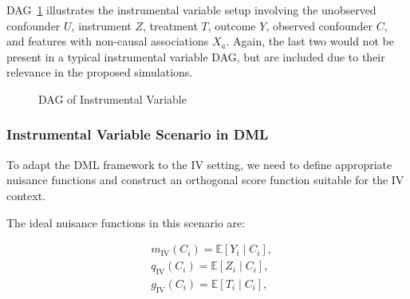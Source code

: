 \documentclass{article}
\numberwithin{equation}{section}
\begin{document}
DAG~\ref{fig:dag_instrumental_variable} illustrates the instrumental variable setup involving the unobserved confounder $U$, instrument $Z$, treatment $T$, outcome $Y$, observed confounder $C$, and features with non-causal associations $X_a$. Again, the last two would not be present in a typical instrumental variable DAG, but are included due to their relevance in the proposed simulations.

\begin{figure}[H]
    \centering
    \caption{DAG of Instrumental Variable}
    \label{fig:dag_instrumental_variable}
\end{figure}
    
\subsubsection{Instrumental Variable Scenario in DML}

To adapt the DML framework to the IV setting, we need to define appropriate nuisance functions and construct an orthogonal score function suitable for the IV context.

The ideal nuisance functions in this scenario are:

\begin{align}
    & m_{\text{IV}}(C_i) = \mathbb{E}[Y_i \mid C_i],
    \label{eq:m_x_for_target_instrumental_variable} \\
    & q_{\text{IV}}(C_i) = \mathbb{E}[Z_i \mid C_i],
    \label{eq:q_z_for_instrument_instrumental_variable} \\
    & g_{\text{IV}}(C_i) = \mathbb{E}[T_i \mid C_i],
    \label{eq:g_x_for_treatment_instrumental_variable}
\end{align}
\end{document}

